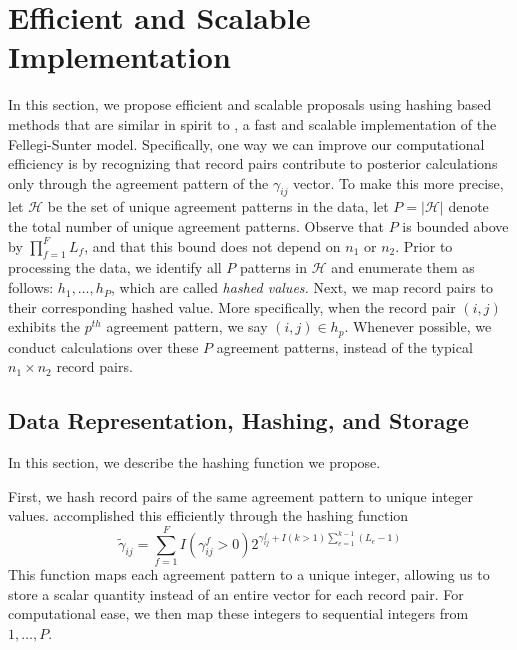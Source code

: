 \documentclass[12pt,letterpaper]{article}
\newcommand{\1}[1]{\mathbb{I}\!\left[#1\right]} %
\begin{document}
\section{Efficient and Scalable Implementation}
\label{sec:efficiency}
In this section, we propose efficient and scalable proposals using hashing based methods that are similar in spirit to \citep{enamorado2019}, a fast and scalable implementation of the Fellegi-Sunter model. 
 Specifically, one way we can improve our computational efficiency is by recognizing that record pairs contribute to posterior calculations only
through the agreement pattern of the \(\gamma_{ij}\) vector. To make this more precise, let 
\(\mathcal{H}\) be the set of unique agreement patterns in the data, let
\(P = |\mathcal{H}|\) denote the total number of unique agreement
patterns.  Observe that \(P\) is bounded above by \(\prod_{f=1}^F L_f\), and
that this bound does not depend on \(n_1\) or \(n_2\). Prior to
processing the data, we identify all \(P\) patterns in \(\mathcal{H}\)
and enumerate them as follows: \(h_1, \ldots, h_P\), which are called \emph{hashed values.}
Next, we map record pairs to their corresponding hashed value. 
More specifically, when the record pair \((i,j)\) 
exhibits the \(p^{th}\) agreement pattern, we say \((i,j) \in h_p\).
Whenever possible, we conduct calculations over these \(P\) agreement
patterns, instead of the typical  \(n_1 \times n_2\) record pairs. 


\hypertarget{data-representation-hashing-and-storage}{%
	\subsection{Data Representation, Hashing, and
		Storage}\label{data-representation-hashing-and-storage}}
		
In this section, we describe the hashing function we propose. 		

First, we hash record pairs of the same agreement pattern to unique integer values. \citep{enamorado2019} accomplished this efficiently through the hashing function
$$\tilde{\gamma}_{ij} = \sum_{f = 1}^F I(\gamma_{ij}^f > 0)2^{\gamma_{ij}^f + I(k>1)\sum_{e=1}^{k-1}(L_e -1)}$$
This function maps each agreement pattern to a unique integer, allowing us to store a scalar quantity instead of an entire vector for each record pair. For computational ease, we then map these integers to sequential integers from $1, \ldots, P.$
\end{document}
